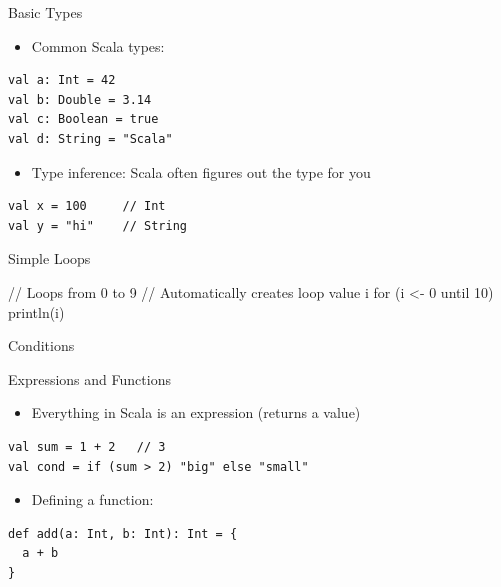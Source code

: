 \begin{frame}[fragile]{Basic Types}
\begin{itemize}
    \item Common Scala types:
\end{itemize}

\begin{verbatim}
val a: Int = 42
val b: Double = 3.14
val c: Boolean = true
val d: String = "Scala"
\end{verbatim}

\begin{itemize}
    \item Type inference: Scala often figures out the type for you
\end{itemize}

\begin{verbatim}
val x = 100     // Int
val y = "hi"    // String
\end{verbatim}
\end{frame}

\begin{frame}[fragile]{Simple Loops}
\begin{chisel}
// Loops from 0 to 9
// Automatically creates loop value i
for (i <- 0 until 10) {
  println(i)
}
\end{chisel}
\end{frame}

\begin{frame}[fragile]{Conditions}
\end{frame}

\begin{frame}[fragile]{Expressions and Functions}
\begin{itemize}
    \item Everything in Scala is an expression (returns a value)
\end{itemize}

\begin{verbatim}
val sum = 1 + 2   // 3
val cond = if (sum > 2) "big" else "small"
\end{verbatim}

\begin{itemize}
    \item Defining a function:
\end{itemize}

\begin{verbatim}
def add(a: Int, b: Int): Int = {
  a + b
}
\end{verbatim}
\end{frame}


